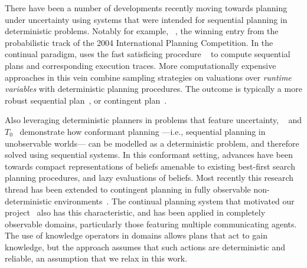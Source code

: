 There have been a number of developments recently moving towards
planning under uncertainty using systems that were intended for
sequential planning in deterministic problems.  Notably for example,
~\cite{yoon:etal:2007}, the winning entry from the
probabilistic track of the 2004 International Planning Competition.
In the continual paradigm,  uses the fast satisficing
procedure ~\cite{hoffmann:nebel:2001} to compute sequential
plans and corresponding execution traces.
More computationally expensive approaches in this vein combine
sampling strategies on valuations over {\em runtime variables} with
deterministic planning procedures. The outcome is typically a more
robust sequential plan~\cite{yoon:etal:2008}, or contingent
plan~\cite{majercik:2006}. 


Also leveraging deterministic planners in problems that feature
uncertainty, ~\cite{hoffmann:brafman:2006} and
$T_0$~\cite{palacios:geffner:2009} demonstrate how conformant planning
---i.e., sequential planning in unobservable worlds--- can be modelled
as a deterministic problem, and therefore solved using sequential
systems. In this conformant setting, advances have been towards
compact representations of beliefs amenable to existing best-first
search planning procedures, and lazy evaluations of beliefs. Most
recently this research thread has been extended to contingent planning
in fully observable non-deterministic
environments~\cite{albore:etal:2009}.
The continual planning system that motivated our
project~\cite{brenner:nebel:jaamas09} also has this characteristic,
and has been applied in completely observable domains, particularly
those featuring multiple communicating agents. The use of knowledge
operators in domains allows plans that act to gain knowledge, but the
approach assumes that such actions are deterministic and reliable, an
assumption that we relax in this work.

